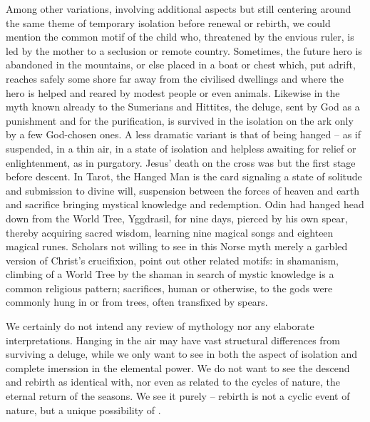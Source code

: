 Among other variations, involving additional aspects but still centering around
the same theme of temporary isolation before renewal or rebirth, we could
mention the common motif of the child who, threatened by the envious ruler, is
led by the mother to a seclusion or remote country. Sometimes, the future hero is abandoned in the mountains, or else placed in a boat or chest which, put adrift, reaches
safely some shore far away from the civilised dwellings and where the hero is
helped and reared by modest people or even animals.  Likewise in the myth known already to the Sumerians and Hittites,
the deluge, sent by God as a punishment and for the purification, is survived in
the isolation on the ark only by a few God-chosen ones.  A less dramatic variant is that of being
hanged -- as if suspended, in a thin air, in a state of isolation and helpless
awaiting for relief or enlightenment, as in purgatory. Jesus' death on the cross
was but the first stage before descent.  In Tarot, the Hanged Man is the card
signaling a state of solitude and submission to divine will, suspension between
the forces of heaven and earth and sacrifice bringing mystical knowledge and
redemption.  Odin had hanged head down from the World Tree, Yggdrasil, for nine
days, pierced by his own spear, thereby acquiring sacred wisdom, learning nine
magical songs and eighteen magical runes.  Scholars not willing to see in this
Norse myth merely a garbled version of Christ's crucifixion, point out other
related motifs: in shamanism, climbing of a World Tree by the shaman in search
of mystic knowledge is a common religious pattern; sacrifices, human or
otherwise, to the gods were commonly hung in or from trees, often transfixed by
spears.

\pa
We certainly do not intend any review of mythology nor any elaborate
interpretations.  Hanging in the air may have vast structural differences from
surviving a deluge, while we only want to see in both the aspect of isolation
and complete imerssion in the elemental power. 
We do not want to see the descend and rebirth as identical with, nor even as
related to the cycles of nature, the eternal return of the seasons. 
We see it purely  -- rebirth
is not a cyclic event of nature, but a unique possibility of .

